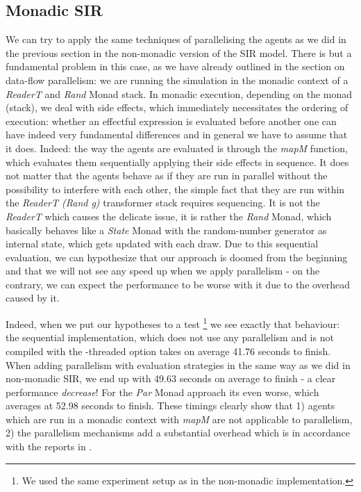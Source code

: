 \subsection{Monadic SIR}
We can try to apply the same techniques of parallelising the agents as we did in the previous section in the non-monadic version of the SIR model. There is but a fundamental problem in this case, as we have already outlined in the section on data-flow parallelism: we are running the simulation in the monadic context of a \textit{ReaderT} and \textit{Rand} Monad stack. In monadic execution, depending on the monad (stack), we deal with side effects, which immediately necessitates the ordering of execution: whether an effectful expression is evaluated before another one can have indeed very fundamental differences and in general we have to assume that it does.
Indeed: the way the agents are evaluated is through the \textit{mapM} function, which evaluates them sequentially applying their side effects in sequence. It does not matter that the agents behave as if they are run in parallel without the possibility to interfere with each other, the simple fact that they are run within the \textit{ReaderT (Rand g)} transformer stack requires sequencing. It is not the \textit{ReaderT} which causes the delicate issue, it is rather the \textit{Rand} Monad, which basically behaves like a \textit{State} Monad with the random-number generator as internal state, which gets updated with each draw.
Due to this sequential evaluation, we can hypothesize that our approach is doomed from the beginning and that we will not see any speed up  when we apply parallelism - on the contrary, we can expect the performance to be worse with it due to the overhead caused by it.

Indeed, when we put our hypotheses to a test \footnote{We used the same experiment setup as in the non-monadic implementation.} we see exactly that behaviour: the sequential implementation, which does not use any parallelism and is not compiled with the -threaded option takes on average 41.76 seconds to finish. When adding parallelism with evaluation strategies in the same way as we did in non-monadic SIR, we end up with 49.63 seconds on average to finish - a clear performance \textit{decrease}! For the \textit{Par} Monad approach its even worse, which averages at 52.98 seconds to finish. These timings clearly show that 1) agents which are run in a monadic context with \textit{mapM} are not applicable to parallelism, 2) the parallelism mechanisms add a substantial overhead which is in accordance with the reports in \cite{marlow_parallel_2013}.

